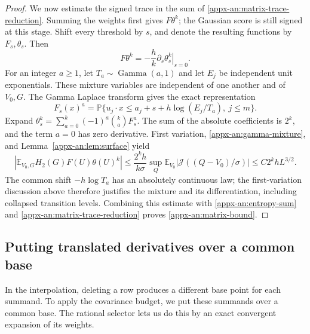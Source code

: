 \documentclass[11pt,letterpaper]{article}
\theoremstyle{remark}
\newcommand{\E}{\mathbb E}
\newcommand{\Pp}{\mathbb P}
\newcommand{\Hh}{H_2}
\newcommand{\surf}{\mathcal J}
\begin{document}
\begin{proof}
We now estimate the signed trace in the sum of
\eqref{appx-an:matrix-trace-reduction}. Summing the weights first gives
\(F\theta^k\); the Gaussian score is still signed at this stage.
Shift every threshold by \(s\),
and denote the resulting functions by \(F_s,\theta_s\).  Then
\[
 F\theta^k=-\frac hk\left.\partial_s\theta_s^k\right|_{s=0}.
\]
For an integer \(a\ge1\), let \(T_a\sim\operatorname{Gamma}(a,1)\)
and let \(E_j\) be independent unit exponentials. These mixture
variables are independent of one another and of \(V_0,G\). The Gamma Laplace
transform gives the exact representation
\begin{equation}
 F_s(x)^a=
 \Pp\{u_j\cdot x\le a_j+s+h\log(E_j/T_a),\ j\le m\}.
 \label{appx-an:gamma-mixture}
\end{equation}
Expand \(\theta_s^k=\sum_{a=0}^k(-1)^a\binom ka F_s^a\).
The sum of the absolute coefficients is \(2^k\), and the term
\(a=0\) has zero derivative.  First variation,
\eqref{appx-an:gamma-mixture}, and Lemma~\ref{appx-an:lem:surface} yield
\[
 \left|\E_{V_0,G}\Hh(G)F(U)\theta(U)^k\right|
 \le\frac{2^kh}{k\sigma}
   \sup_Q\E_{V_0}|\surf((Q-V_0)/\sigma)|
 \le C2^khL^{3/2}.
\]
The common shift \(-h\log T_a\) has an absolutely continuous law;
the first-variation discussion above therefore justifies the mixture
and its differentiation, including collapsed transition levels.
Combining this estimate with \eqref{appx-an:entropy-sum} and
\eqref{appx-an:matrix-trace-reduction} proves \eqref{appx-an:matrix-bound}.
\end{proof}

\subsection{Putting translated derivatives over a common base}
\label{appx-an:sec:restoration}

In the interpolation, deleting a row produces a different base point
for each summand.  To apply the covariance budget, we put these
summands over a common base.  The rational selector lets
us do this by an exact convergent expansion of its weights.
\end{document}
